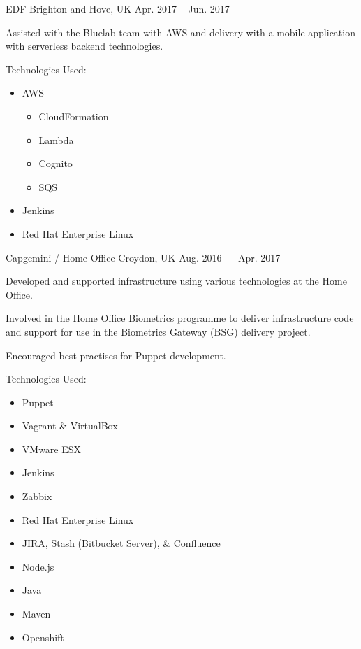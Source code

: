 \begin{cventries}
	{EDF} %
	{Brighton and Hove, UK} %
	{Apr. 2017 -- Jun. 2017} %
	{
		\begin{cvitems} %
		\item {Assisted with the Bluelab team with AWS and delivery with a mobile application with serverless backend technologies.}
		\item {Technologies Used: }
			\begin{itemize}
				\item {AWS}
					\begin{itemize}
						\item {CloudFormation}
						\item {Lambda}
						\item {Cognito}
						\item {SQS}
					\end{itemize}
				\item {Jenkins}
				\item {Red Hat Enterprise Linux}
			\end{itemize}
		\end{cvitems}
	}


    {Capgemini / Home Office} %
    {Croydon, UK} %
    {Aug. 2016 — Apr. 2017} %
    {
	    \begin{cvitems} %
	    \item {Developed and supported infrastructure using various technologies at the Home Office.}
	    \item {Involved in the Home Office Biometrics programme to deliver infrastructure code and support for use in the Biometrics Gateway (BSG) delivery project.}
	    \item {Encouraged best practises for Puppet development.}
	    \item {Technologies Used: }
		    \begin{itemize}
			    \item {Puppet}
			    \item {Vagrant \& VirtualBox}
			    \item {VMware ESX}
			    \item {Jenkins}
			    \item {Zabbix}
			    \item {Red Hat Enterprise Linux}
			    \item {JIRA, Stash (Bitbucket Server), \& Confluence}
			    \item {Node.js}
			    \item {Java}
			    \item {Maven}
			    \item {Openshift}
		    \end{itemize}
	    \end{cvitems}
    }



\end{cventries}
